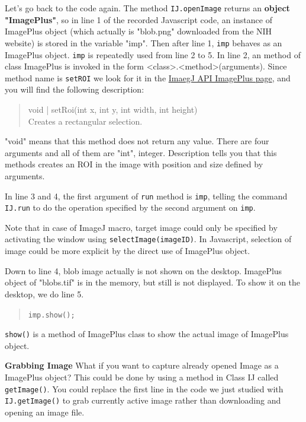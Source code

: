 \documentclass[11pt,a4paper,oneside]{report}
\newcommand{\ijmenu}[1]{\texttt{\small#1}}
\newcommand{\ilcom}[1]{\texttt{\small#1}}
\begin{document}
Let's go back to the code again. 
The method \ilcom{IJ.openImage} returns an \textbf{object "ImagePlus"}, 
so in line 1 of the recorded Javascript code, 
an instance of ImagePlus object (which actually is "blob.png" downloaded from the NIH website) 
is stored in the variable "imp". 
Then after line 1, \ilcom{imp} behaves as an ImagePlus object. 
\ilcom{imp} is repeatedly used from line 2 to 5. In line 2, an method of class ImagePlus is invoked 
in the form <class>.<method>(arguments). 
Since method name is \ilcom{setROI} we look for it in the 
\href{http://rsb.info.nih.gov/ij/developer/api/ij/ImagePlus.html}{ImaegJ API ImagePlus page}, 
and you will find the following description:

\begin{quote}
void | setRoi(int x, int y, int width, int height) \\
          Creates a rectangular selection.
\end{quote}

"void" means that this method does not return any value. 
There are four arguments and all of them are "int", integer. 
Description tells you that this methods creates an ROI in the image with position and size 
defined by arguments.  

In line 3 and 4, the first argument of \ilcom{run} method is \ilcom{imp}, 
telling the command \ilcom{IJ.run} to do the operation specified by the second argument on \ilcom{imp}. 

Note that in case of ImageJ macro, target image could only be specified by 
activating the window using \ilcom{selectImage(imageID)}. 
In Javascript, selection of image could be more explicit by the direct use of ImagePlus object.  

Down to line 4, blob image actually is not shown on the desktop. 
ImagePlus object of "blobs.tif" is in the memory, but still is not displayed. To
show it on the desktop, we do line 5.

\begin{quote}
\ilcom{imp.show();}
\end{quote}

\ilcom{show()} is a method of ImagePlus class to show the actual image of ImagePlus object. 


\textbf{Grabbing Image}
What if you want to capture already opened Image as a ImagePlus object? 
This could be done by using a method in Class IJ called \ilcom{getImage()}. 
You could replace the first line in the code we just studied with \ilcom{IJ.getImage()} 
to grab currently active image rather than downloading and opening an image file. 
\end{document}
